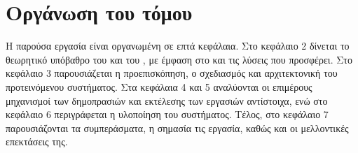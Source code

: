 \section{Οργάνωση του τόμου}
Η παρούσα εργασία είναι οργανωμένη σε επτά κεφάλαια. Στο κεφάλαιο 2 δίνεται το θεωρητικό υπόβαθρο του  και του , με έμφαση στο  και τις λύσεις που προσφέρει. Στο κεφάλαιο 3 παρουσιάζεται η προεπισκόπηση, ο σχεδιασμός και αρχιτεκτονική του προτεινόμενου συστήματος. Στα κεφάλαια 4 και 5 αναλύονται οι επιμέρους μηχανισμοί των δημοπρασιών και εκτέλεσης των εργασιών αντίστοιχα, ενώ στο κεφάλαιο 6 περιγράφεται η υλοποίηση του συστήματος. Τέλος, στο κεφάλαιο 7 παρουσιάζονται τα συμπεράσματα, η σημασία τις εργασία, καθώς και οι μελλοντικές επεκτάσεις της.